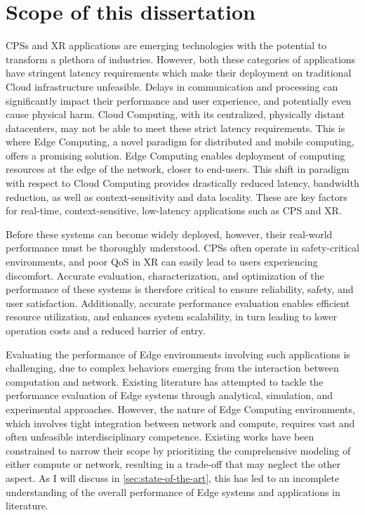 \section{Scope of this dissertation}
\glsresetall%

\glspl{CPS} and \gls{XR} applications are emerging technologies with the potential to transform a plethora of industries.
However, both these categories of applications have stringent latency requirements which make their deployment on traditional Cloud infrastructure unfeasible.
Delays in communication and processing can significantly impact their performance and user experience, and potentially even cause physical harm.
Cloud Computing, with its centralized, physically distant datacenters, may not be able to meet these strict latency requirements.
This is where Edge Computing, a novel paradigm for distributed and mobile computing, offers a promising solution.
Edge Computing enables deployment of computing resources at the edge of the network, closer to end-users.
This shift in paradigm with respect to Cloud Computing provides drastically reduced latency, bandwidth reduction, as well as context-sensitivity and data locality.
These are key factors for real-time, context-sensitive, low-latency applications such as \gls{CPS} and \gls{XR}.



Before these systems can become widely deployed, however, their real-world performance must be thoroughly understood.
\glspl{CPS} often operate in safety-critical environments, and poor \gls{QoS} in \gls{XR} can easily lead to users experiencing discomfort.
Accurate evaluation, characterization, and optimization of the performance of these systems is therefore critical to ensure reliability, safety, and user satisfaction.
Additionally, accurate performance evaluation enables efficient resource utilization, and enhances system scalability, in turn leading to lower operation costs and a reduced barrier of entry.

Evaluating the performance of Edge environments involving such applications is challenging, due to complex behaviors emerging from the interaction between computation and network.
Existing literature has attempted to tackle the performance evaluation of Edge systems through analytical, simulation, and experimental approaches.
However, the nature of Edge Computing environments, which involves tight integration between network and compute, requires vast and often unfeasible interdisciplinary competence.
Existing works have been constrained to narrow their scope by prioritizing the comprehensive modeling of either compute or network, resulting in a trade-off that may neglect the other aspect.
As I will discuss in \cref{sec:state-of-the-art}, this has led to an incomplete understanding of the overall performance of Edge systems and applications in literature.


